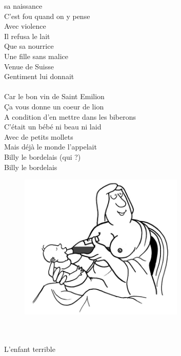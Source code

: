 
 sa naissance
\\C'est fou quand on y pense
\\Avec violence
\\Il refusa le lait
\\Que sa nourrice
\\Une fille sans malice
\\Venue de Suisse
\\Gentiment lui donnait
\\\\Car le bon vin de Saint Emilion
\\Ça vous donne un coeur de lion
\\A condition d'en mettre dans les biberons
\\C'était un bébé ni beau ni laid
\\Avec de petits mollets
\\Mais déjà le monde l'appelait
\\Billy le bordelais (qui ?)
\\Billy le bordelais
\begin{figure}[h!]
\centering
   \includegraphics[width=0.7\textwidth]{images/Billy.png}
 \end{figure}
\breakpage
\\\\L'enfant terrible
